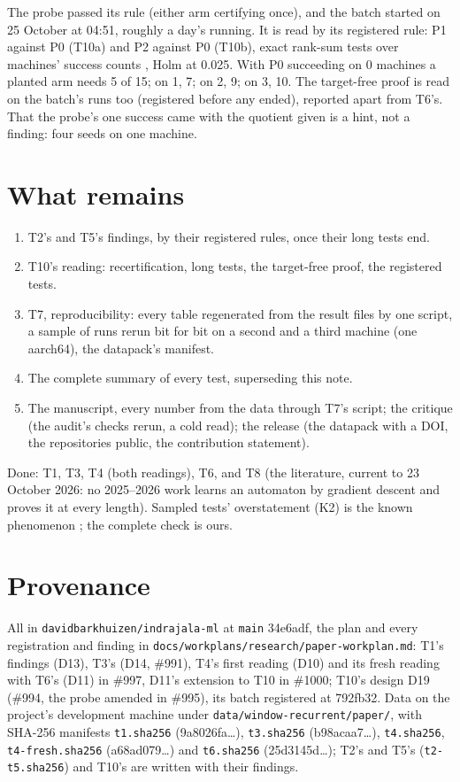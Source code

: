 \documentclass[11pt]{article}
\begin{document}
The probe passed its rule (either arm certifying once), and the batch started on 25 October at
04:51, roughly a day's running. It is read by its registered rule: P1 against P0 (T10a) and P2
against P0 (T10b), exact rank-sum tests over machines' success counts
\citep{mann-whitney-1947}, Holm at 0.025. With P0 succeeding on 0 machines a planted arm needs 5 of
15; on 1, 7; on 2, 9; on 3, 10. The target-free proof is read on the batch's runs too (registered
before any ended), reported apart from T6's. That the probe's one success came with the quotient
given is a hint, not a finding: four seeds on one machine.

\section{What remains}

\begin{enumerate}
  \item T2's and T5's findings, by their registered rules, once their long tests end.
  \item T10's reading: recertification, long tests, the target-free proof, the registered tests.
  \item T7, reproducibility: every table regenerated from the result files by one script, a sample
  of runs rerun bit for bit on a second and a third machine (one aarch64), the datapack's manifest.
  \item The complete summary of every test, superseding this note.
  \item The manuscript, every number from the data through T7's script; the critique (the audit's
  checks rerun, a cold read); the release (the datapack with a DOI, the repositories public, the
  contribution statement).
\end{enumerate}

Done: T1, T3, T4 (both readings), T6, and T8 (the literature, current to 23 October 2026: no
2025--2026 work learns an automaton by gradient descent and proves it at every length). Sampled
tests' overstatement (K2) is the known phenomenon \citep{weiss-2018-extracting-automata-queries-counterexamples};
the complete check is ours.

\section{Provenance}
\label{sec:provenance}

All in \texttt{davidbarkhuizen/indrajala-ml} at \texttt{main} 34e6adf, the plan and every
registration and finding in \texttt{docs/workplans/research/paper-workplan.md}: T1's findings (D13), T3's
(D14, \#991), T4's first reading (D10) and its fresh reading with T6's (D11) in \#997, D11's
extension to T10 in \#1000; T10's design D19 (\#994, the probe amended in \#995), its batch
registered at 792fb32. Data on the project's development machine under
\texttt{data/window-recurrent/paper/}, with SHA-256 manifests \texttt{t1.sha256} (9a8026fa\ldots),
\texttt{t3.sha256} (b98acaa7\ldots), \texttt{t4.sha256}, \texttt{t4-fresh.sha256} (a68ad079\ldots)
and \texttt{t6.sha256} (25d3145d\ldots); T2's and T5's (\texttt{t2-t5.sha256}) and T10's are written
with their findings.



\end{document}
